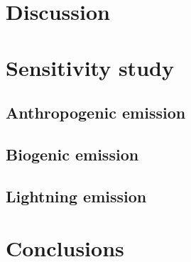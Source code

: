 \ifpdf
    \graphicspath{{Chapter_2006/figures/PNG/}{Chapter_2006/figures/PDF/}{Chapter_2006/figures/}}
\else
    \graphicspath{{Chapter_2006/figures/EPS/}{Chapter_2006/figures/}}
\fi

\section{Discussion}\label{sec:2006/discussion}

\section{Sensitivity study}\label{sec:2006/sens}
\subsection{Anthropogenic emission}\label{ssec:2006/sens/anthrop}
\subsection{Biogenic emission}\label{ssec:2006/sens/bio}
\subsection{Lightning emission}\label{ssec:2006/sens/lnox}

\section{Conclusions}\label{sec:2006/conslusion}